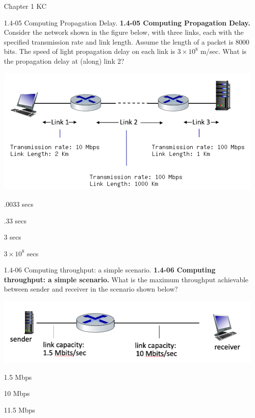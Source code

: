 \documentclass[a4paper]{article}
\begin{document}
\begin{quiz}{Chapter 1 KC}
\begin{multi}[points=1,shuffle=true]{1.4-05 Computing Propagation Delay.}
\textbf{1.4-05 Computing Propagation Delay.} 
Consider the network shown in the figure below, with three links, each with the specified transmission rate and link length. Assume the length of a packet is 8000 bits. The speed of light propagation delay on each link is $3\times10^8$ m/sec.
What is the propagation delay at (along) link 2? 
\begin{center}
\includegraphics[width=.9\linewidth]{figs/1.4.4.png}
\end{center}

\item* .0033 secs
\item .33 secs
\item 3 secs
\item $3\times10^8$ secs
\end{multi}

\begin{multi}[points=1,shuffle=true]{1.4-06 Computing throughput: a simple scenario.}
\textbf{1.4-06 Computing throughput: a simple scenario.} 
What is the maximum throughput achievable between sender and receiver in the scenario shown below? 
\begin{center}
\includegraphics[width=.9\linewidth]{figs/1.4.6.jpg}
\end{center}
%  
\item* 1.5 Mbps
\item 10 Mbps
\item 11.5 Mbps
\end{multi}


\end{quiz}
\end{document}
